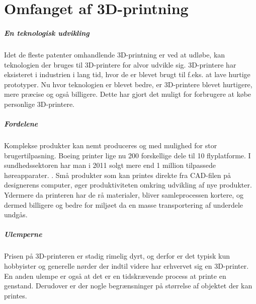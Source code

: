\chapter{Omfanget af 3D-printning} %
\label{cha:omfanget_af_3d_printer}

\paragraph{En teknologisk udvikling} %
\label{par:en_teknologisk_udvikling}



Idet de fleste patenter omhandlende 3D-printning er ved at udløbe, kan teknologien der bruges til 3D-printere for alvor udvikle sig. 3D-printere har eksisteret i industrien i lang tid, hvor de er blevet brugt til f.eks. at lave hurtige prototyper. Nu hvor teknologien er blevet bedre, er 3D-printere blevet hurtigere, mere præcise og også billigere. Dette har gjort det muligt for forbrugere at købe personlige 3D-printere. 


\paragraph{Fordelene} %
\label{par:fordelene}


Komplekse produkter kan nemt produceres og med mulighed for stor brugertilpasning. Boeing printer lige nu 200 forskellige dele til 10 flyplatforme. I sundhedssektoren har man i 2011 solgt mere end 1 million tilpassede høreapparater. \cite{manyika_disruptive_2013}. Små produkter som kan printes direkte fra CAD-filen på designerens computer, øger produktiviteten omkring udvikling af nye produkter. Ydermere da printeren har de rå materialer, bliver samleprocessen kortere, og dermed billigere og bedre for miljøet da en masse transportering af underdele undgås.


\paragraph{Ulemperne} %
\label{par:ulemperne}


Prisen på 3D-printeren er stadig rimelig dyrt, og derfor er det typisk kun hobbyister og generelle nørder der indtil videre har erhvervet sig en 3D-printer. En anden ulempe er også at det er en tidskrævende process at printe en genstand. Derudover er der nogle begrænsninger på størrelse af objektet der kan printes.


